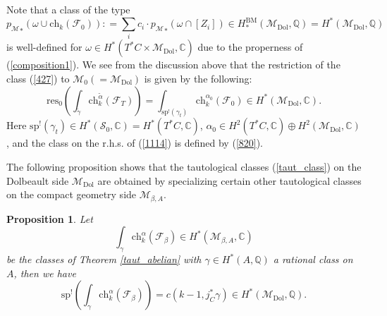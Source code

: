 \documentclass[11pt]{amsart}
\theoremstyle{plain}
\newtheorem{prop}[thm]{Proposition}
\theoremstyle{definition}
\theoremstyle{remark}
\newcommand{\BC}{{\mathbb{C}}}
\newcommand{\BQ}{{\mathbb{Q}}}
\newcommand{\CF}{{\mathcal F}}
\newcommand{\CM}{{\mathcal M}}
\newcommand{\CS}{{\mathcal S}}
\begin{document}
 Note that a class of the type
\begin{equation}\label{820}
{p_\CM}_*(\omega \cup \mathrm{ch}_k(\CF_0)): = \sum_i c_i\cdot {p_{\CM}}_*(\omega \cap [Z_i]) \in H^{\mathrm{BM}}_*(\CM_{\mathrm{Dol}}, \BQ) = H^*(\CM_{\mathrm{Dol}}, \BQ)
\end{equation}
is well-defined for $\omega \in H^*(T^*C \times \CM_{\mathrm{Dol}}, \BC)$ due to the properness of (\ref{composition1}). We see from the discussion above that the restriction of the class (\ref{427}) to $\CM_0 (= \CM_{\mathrm{Dol}})$ is given by the following:
\begin{equation}\label{1114}
\mathrm{res}_0\left( \int_{\tilde{\gamma}} \mathrm{ch}_k^{\tilde{\alpha}} (\CF_T) \right) = \int_{\mathrm{sp}^!(\gamma_t)} \mathrm{ch}_k^{\alpha_0}(\CF_0) \in H^*(\CM_{\mathrm{Dol}}, \BC).
\end{equation}
Here $\mathrm{sp}^!(\gamma_t) \in H^*(\CS_0, \BC) = H^*(T^*C, \BC)$, $\alpha_0 \in H^2(T^*C, \BC)\oplus H^2(\CM_{\mathrm{Dol}}, \BC)$, and the class on the r.h.s. of (\ref{1114}) is defined by (\ref{820}).


The following proposition shows that the tautological classes (\ref{taut_class}) on the Dolbeault side $\CM_{\mathrm{Dol}}$  are obtained by specializing certain other tautological classes on the compact geometry side $\CM_{\beta,A}$.

\begin{prop}\label{prop4.8}
Let 
\[
\int_{\gamma} \mathrm{ch}_k^\alpha (\CF_\beta) \in H^*(\CM_{\beta,A}, \BC)
\]
be the classes of Theorem \ref{taut_abelian} with $\gamma \in H^*(A, \BQ)$ a rational class on $A$, then we have 
\[
\mathrm{sp}^!\left( \int_{\gamma} \mathrm{ch}_k^\alpha (\CF_\beta) \right) = c(k-1, j_C^*\gamma) \in H^*(\CM_{\mathrm{Dol}}, \BQ).
\]
\end{prop}
\end{document}
